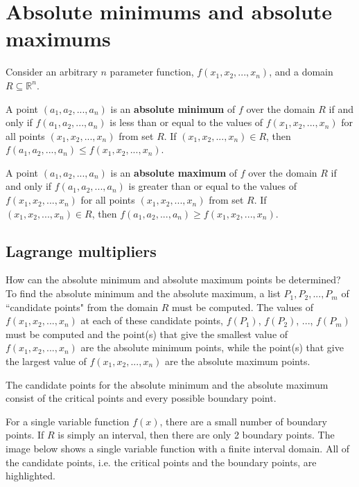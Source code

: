 \documentclass{article}
\begin{document}
\section*{Absolute minimums and absolute maximums}

Consider an arbitrary \(n\) parameter function, \(f(x_1, x_2, ..., x_n)\), and a domain \(R \subseteq \mathbb{R}^n\). 

A point \((a_1, a_2, ..., a_n)\) is an {\bf absolute minimum} of \(f\) over the domain \(R\) if and only if \(f(a_1, a_2, ..., a_n)\) is less than or equal to the values of \(f(x_1, x_2, ..., x_n)\) for all points \((x_1, x_2, ..., x_n)\) from set \(R\). If \((x_1, x_2, ..., x_n) \in R\), then \(f(a_1, a_2, ..., a_n) \leq f(x_1, x_2, ..., x_n)\). 

A point \((a_1, a_2, ..., a_n)\) is an {\bf absolute maximum} of \(f\) over the domain \(R\) if and only if \(f(a_1, a_2, ..., a_n)\) is greater than or equal to the values of \(f(x_1, x_2, ..., x_n)\) for all points \((x_1, x_2, ..., x_n)\) from set \(R\). If \((x_1, x_2, ..., x_n) \in R\), then \(f(a_1, a_2, ..., a_n) \geq f(x_1, x_2, ..., x_n)\). 



\subsection*{Lagrange multipliers}

How can the absolute minimum and absolute maximum points be determined? To find the absolute minimum and the absolute maximum, a list \(P_1, P_2, ..., P_m\) of ``candidate points" from the domain \(R\) must be computed. The values of \(f(x_1, x_2, ..., x_n)\) at each of these candidate points, \(f(P_1)\), \(f(P_2)\), ..., \(f(P_m)\) must be computed and the point(s) that give the smallest value of \(f(x_1, x_2, ..., x_n)\) are the absolute minimum points, while the point(s) that give the largest value of \(f(x_1, x_2, ..., x_n)\) are the absolute maximum points.  

The candidate points for the absolute minimum and the absolute maximum consist of the critical points and every possible boundary point. 

For a single variable function \(f(x)\), there are a small number of boundary points. If \(R\) is simply an interval, then there are only 2 boundary points. The image below shows a single variable function with a finite interval domain. All of the candidate points, i.e. the critical points and the boundary points, are highlighted.
\end{document}
